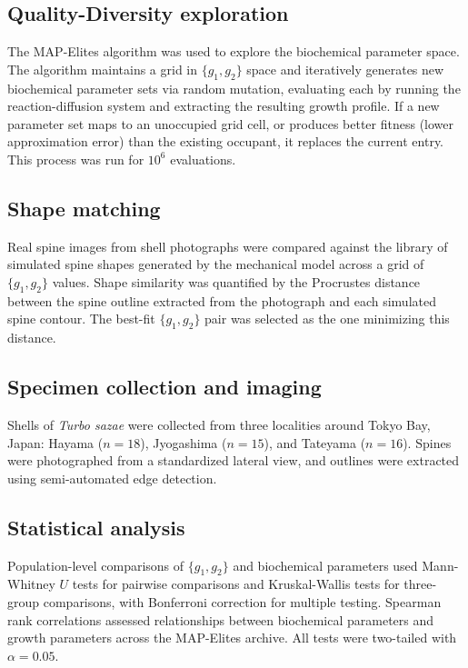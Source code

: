 \documentclass[11pt]{article}
\begin{document}
\subsection{Quality-Diversity exploration}

The MAP-Elites algorithm \citep{mouret2015} was used to explore the biochemical parameter space. The algorithm maintains a grid in $\{g_1, g_2\}$ space and iteratively generates new biochemical parameter sets via random mutation, evaluating each by running the reaction-diffusion system and extracting the resulting growth profile. If a new parameter set maps to an unoccupied grid cell, or produces better fitness (lower approximation error) than the existing occupant, it replaces the current entry. This process was run for $10^6$ evaluations.

\subsection{Shape matching}

Real spine images from shell photographs were compared against the library of simulated spine shapes generated by the mechanical model across a grid of $\{g_1, g_2\}$ values. Shape similarity was quantified by the Procrustes distance between the spine outline extracted from the photograph and each simulated spine contour. The best-fit $\{g_1, g_2\}$ pair was selected as the one minimizing this distance.

\subsection{Specimen collection and imaging}

Shells of \textit{Turbo sazae} were collected from three localities around Tokyo Bay, Japan: Hayama ($n = 18$), Jyogashima ($n = 15$), and Tateyama ($n = 16$). Spines were photographed from a standardized lateral view, and outlines were extracted using semi-automated edge detection.

\subsection{Statistical analysis}

Population-level comparisons of $\{g_1, g_2\}$ and biochemical parameters used Mann-Whitney $U$ tests for pairwise comparisons and Kruskal-Wallis tests for three-group comparisons, with Bonferroni correction for multiple testing. Spearman rank correlations assessed relationships between biochemical parameters and growth parameters across the MAP-Elites archive. All tests were two-tailed with $\alpha = 0.05$.
\end{document}
